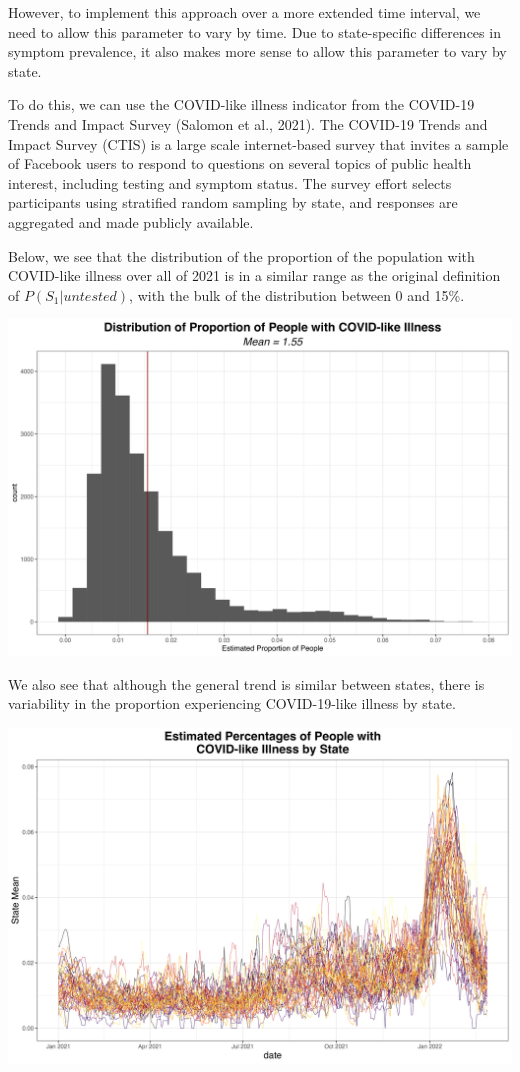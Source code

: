 \documentclass[12pt,twoside]{smiththesis}
\begin{document}
However, to implement this approach over a more extended time interval, we need to allow this parameter to vary by time. Due to state-specific differences in symptom prevalence, it also makes more sense to allow this parameter to vary by state.

To do this, we can use the COVID-like illness indicator from the COVID-19 Trends and Impact Survey (Salomon et al., 2021). The COVID-19 Trends and Impact Survey (CTIS) is a large scale internet-based survey that invites a sample of Facebook users to respond to questions on several topics of public health interest, including testing and symptom status. The survey effort selects participants using stratified random sampling by state, and responses are aggregated and made publicly available.

Below, we see that the distribution of the proportion of the population with COVID-like illness over all of 2021 is in a similar range as the original definition of \(P(S_1|untested)\), with the bulk of the distribution between 0 and 15\%.
\begin{center}\includegraphics[width=0.8\linewidth]{./figure/emp_distribution_p_s_untested} \end{center}

We also see that although the general trend is similar between states, there is variability in the proportion experiencing COVID-19-like illness by state.
\begin{center}\includegraphics[width=0.8\linewidth]{./figure/cli_by_state} \end{center}
\end{document}
